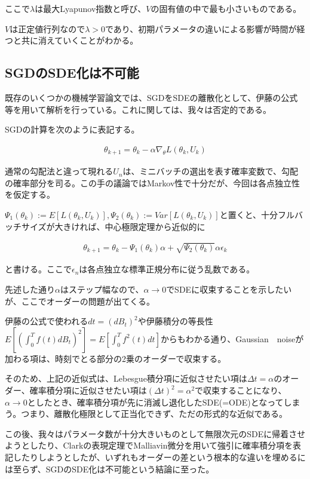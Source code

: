 \documentclass{jsarticle}
\begin{document}
ここで$\lambda$は最大Lyapunov指数と呼び、$V$の固有値の中で最も小さいものである。

$V$は正定値行列なので$\lambda>0$であり、初期パラメータの違いによる影響が時間が経つと共に消えていくことがわかる。



\subsection{SGDのSDE化は不可能}
既存のいくつかの機械学習論文では、SGDをSDEの離散化として、伊藤の公式等を用いて解析を行っている。これに関しては、我々は否定的である。

SGDの計算を次のように表記する。

\begin{align}
\theta_{k+1}=\theta_k-\alpha\nabla_\theta L(\theta_k,U_k)
\end{align}

通常の勾配法と違って現れる$U_n$は、ミニバッチの選出を表す確率変数で、勾配の確率部分を司る。この手の議論ではMarkov性で十分だが、今回は各点独立性を仮定する。

$\Psi_1(\theta_k):=E[L(\theta_k,U_k)],\Psi_2(\theta_k):=Var[L(\theta_k,U_k)]$と置くと、十分フルバッチサイズが大きければ、中心極限定理から近似的に


\begin{align}
\theta_{k+1}=\theta_k-\Psi_1(\theta_k)\alpha+\sqrt{\Psi_2(\theta_k)}\alpha\epsilon_k
\end{align}

と書ける。ここで$\epsilon_n$は各点独立な標準正規分布に従う乱数である。

先述した通り$\alpha$はステップ幅なので、$\alpha\to0$でSDEに収束することを示したいが、ここでオーダーの問題が出てくる。

伊藤の公式で使われる$dt=(dB_t)^2$や伊藤積分の等長性$E[(\int_0^T f(t)dB_t)^2]=E[\int^T_0 f^2(t)dt]$からもわかる通り、Gaussian　noiseが加わる項は、時刻でとる部分の2乗のオーダーで収束する。

そのため、上記の近似式は、Lebesgue積分項に近似させたい項は$\Delta t=\alpha$のオーダー、確率積分項に近似させたい項は$(\Delta t)^2=\alpha^2$で収束することになり、$\alpha\to 0$としたとき、確率積分項が先に消滅し退化したSDE(=ODE)となってしまう。つまり、離散化極限として正当化できず、ただの形式的な近似である。

この後、我々はパラメータ数が十分大きいものとして無限次元のSDEに帰着させようとしたり、Clarkの表現定理でMalliavin微分を用いて強引に確率積分項を表記したりしようとしたが、いずれもオーダーの差という根本的な違いを埋めるには至らず、SGDのSDE化は不可能という結論に至った。
\end{document}
